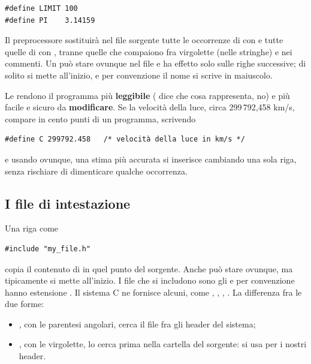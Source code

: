 \begin{lstlisting}[style=c]
#define LIMIT 100
#define PI    3.14159
\end{lstlisting}

Il preprocessore sostituirà nel file sorgente tutte le occorrenze di
 con  e tutte quelle di  con
, tranne quelle che compaiono fra virgolette (nelle stringhe)
e nei commenti. Un  può stare ovunque nel file e ha effetto
solo sulle righe successive; di solito si mette all'inizio, e per
convenzione il nome si scrive in maiuscolo.

Le  rendono il programma più \textbf{leggibile}
( dice che cosa rappresenta,  no) e più facile e
sicuro da \textbf{modificare}. Se la velocità della luce, circa 299\,792,458
km/s, compare in cento punti di un programma, scrivendo

\begin{lstlisting}[style=c]
#define C 299792.458   /* velocità della luce in km/s */
\end{lstlisting}

e usando  ovunque, una stima più accurata si inserisce cambiando
una sola riga, senza rischiare di dimenticare qualche occorrenza.

\subsection{I file di intestazione}

Una riga come

\begin{lstlisting}[style=c]
#include "my_file.h"
\end{lstlisting}

copia il contenuto di  in quel punto del sorgente. Anche
 può stare ovunque, ma tipicamente si mette all'inizio. I
file che si includono sono gli  e per convenzione hanno
estensione . Il sistema C ne fornisce alcuni, come
, , , . La
differenza fra le due forme:

\begin{itemize}
  \item {}, con le parentesi angolari, cerca il file
        fra gli header del sistema;
  \item {}, con le virgolette, lo cerca prima
        nella cartella del sorgente: si usa per i nostri header.
\end{itemize}


